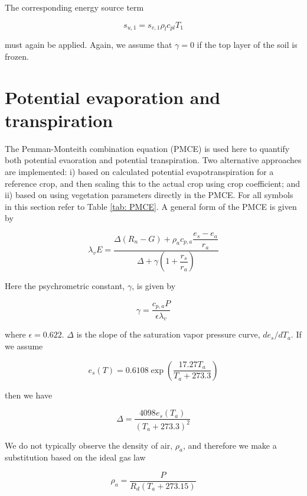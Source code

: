 \documentclass[10pt,a4paper]{article}
\begin{document}
The corresponding energy source term

\begin{equation}
s_{u,1}=s_{v,1}\rho_l c_{pl}T_1
\end{equation}

must again be applied. Again, we assume that $\gamma=0$ if the top layer of the soil is frozen.

\section{Potential evaporation and transpiration}

The Penman-Monteith combination equation (PMCE) is used here to quantify both potential evaoration and potential transpiration. Two alternative approaches are implemented: i) based on calculated potential evapotranspiration for a reference crop, and then scaling this to the actual crop using crop coefficient; and ii) based on using vegetation parameters directly in the PMCE. For all symbols in this section refer to Table \ref{tab: PMCE}. A general form of the PMCE is given by

\begin{equation}
\lambda_v E =
\frac{
    \Delta (R_n-G)
    + \rho_a c_{p,a} \dfrac{e_s-e_a}{r_a}
}{
    \Delta + \gamma\left(1+\dfrac{r_s}{r_a}\right)
}
\end{equation}

Here the psychrometric constant, $\gamma$, is given by 

\begin{equation}
\gamma=\dfrac{c_{p,a}P}{\epsilon \lambda_v}
\end{equation}

where $\epsilon = 0.622$. $\Delta$ is the slope of the saturation vapor pressure curve, $de_s/dT_a$. If we assume

\begin{equation}
e_s(T)=0.6108\exp\left(\dfrac{17.27T_a}{T_a+273.3}\right)
\end{equation}

then we have 

\begin{equation}
\Delta = \dfrac{4098e_s(T_a)}{(T_a+273.3)^2}
\end{equation}

We do not typically observe the density of air, $\rho_a$, and therefore we make a substitution based on the ideal gas law

\begin{equation}
\rho_a=\dfrac{P}{R_d(T_a+273.15)}
\end{equation}
\end{document}
